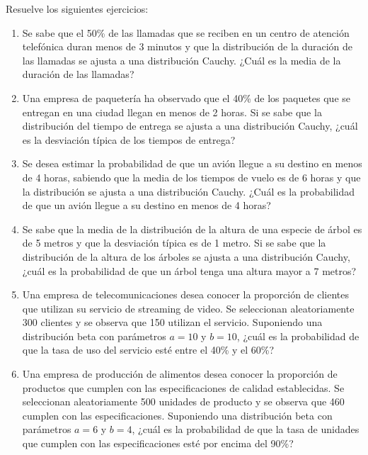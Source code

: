 \begin{Ejer}
Resuelve los siguientes ejercicios:
\begin{enumerate}

    \item Se sabe que el 50\% de las llamadas que se reciben en un centro de atención telefónica duran menos de 3 minutos y que la distribución de la duración de las llamadas se ajusta a una distribución Cauchy. ¿Cuál es la media de la duración de las llamadas?

    \item Una empresa de paquetería ha observado que el 40\% de los paquetes que se entregan en una ciudad llegan en menos de 2 horas. Si se sabe que la distribución del tiempo de entrega se ajusta a una distribución Cauchy, ¿cuál es la desviación típica de los tiempos de entrega?

    \item Se desea estimar la probabilidad de que un avión llegue a su destino en menos de 4 horas, sabiendo que la media de los tiempos de vuelo es de 6 horas y que la distribución se ajusta a una distribución Cauchy. ¿Cuál es la probabilidad de que un avión llegue a su destino en menos de 4 horas?

    \item Se sabe que la media de la distribución de la altura de una especie de árbol es de 5 metros y que la desviación típica es de 1 metro. Si se sabe que la distribución de la altura de los árboles se ajusta a una distribución Cauchy, ¿cuál es la probabilidad de que un árbol tenga una altura mayor a 7 metros?

    \item Una empresa de telecomunicaciones desea conocer la proporción de clientes que utilizan su servicio de streaming de video. Se seleccionan aleatoriamente 300 clientes y se observa que 150 utilizan el servicio. Suponiendo una distribución beta con parámetros $a=10$ y $b=10$, ¿cuál es la probabilidad de que la tasa de uso del servicio esté entre el 40\% y el 60\%?

    \item Una empresa de producción de alimentos desea conocer la proporción de productos que cumplen con las especificaciones de calidad establecidas. Se seleccionan aleatoriamente 500 unidades de producto y se observa que 460 cumplen con las especificaciones. Suponiendo una distribución beta con parámetros $a=6$ y $b=4$, ¿cuál es la probabilidad de que la tasa de unidades que cumplen con las especificaciones esté por encima del 90\%?
\end{enumerate}

\end{Ejer}

